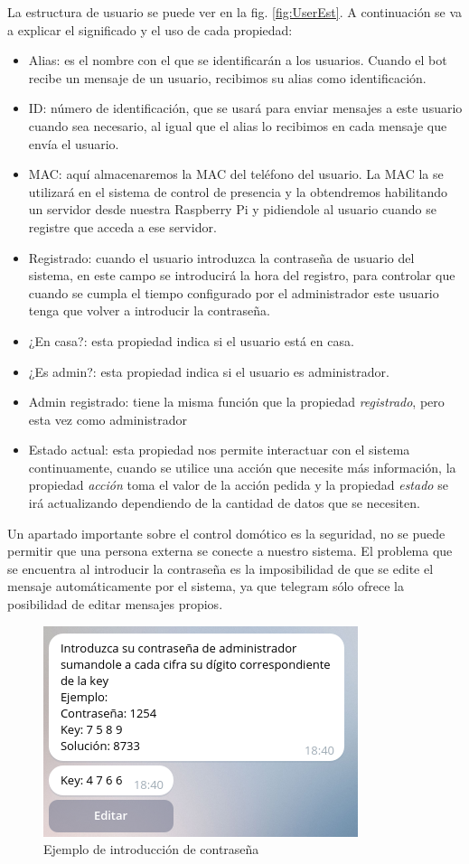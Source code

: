 \documentclass[10pt,journal,compsoc]{IEEEtran}
\begin{document}
La estructura de  usuario se puede ver en la fig. \ref{fig:UserEst}. A continuación se va a explicar 
el significado y el uso de cada propiedad:
\begin{itemize}
\item Alias: es el nombre con el que se identificarán a los usuarios. Cuando el bot recibe un mensaje 
de un usuario, recibimos su alias como identificación.
\item ID: número de identificación, que se usará para enviar mensajes a este usuario cuando sea 
necesario, al igual que el alias lo recibimos en cada mensaje que envía el usuario.
\item MAC: aquí almacenaremos la MAC del teléfono del usuario. La MAC la se utilizará en el 
sistema de control de presencia y la obtendremos habilitando un servidor desde nuestra 
Raspberry Pi y pidiendole al usuario cuando se registre que acceda a ese servidor.
\item Registrado: cuando el usuario introduzca la contraseña de usuario del sistema, en 
este campo se introducirá la hora del registro, para controlar que cuando se cumpla el tiempo 
configurado por el administrador este usuario tenga que volver a introducir la contraseña.
\item ¿En casa?: esta propiedad indica si el usuario está en casa. 
\item ¿Es admin?: esta propiedad indica si el usuario es administrador.
\item Admin registrado: tiene la misma función que la propiedad \textit{registrado}, pero esta 
vez como administrador 
\item Estado actual: esta propiedad nos permite interactuar con el sistema continuamente, 
cuando se utilice una acción que necesite más información, la propiedad \textit{acción} toma 
el valor de la acción pedida y la propiedad \textit{estado} se irá actualizando dependiendo de 
la cantidad de datos que se necesiten.
\end{itemize}

Un apartado importante sobre el control domótico es la seguridad, no se puede permitir que 
una persona externa se conecte a nuestro sistema. El problema que se encuentra al introducir 
la contraseña es la imposibilidad de que se edite el mensaje automáticamente por el sistema, 
ya que telegram sólo ofrece la posibilidad de editar mensajes propios. 

\begin{figure}[h]
\centering
\includegraphics[scale=0.6]{imgPass}
\caption{Ejemplo de introducción de contraseña}
\label{fig:imgPass}
\end{figure}
\end{document}
